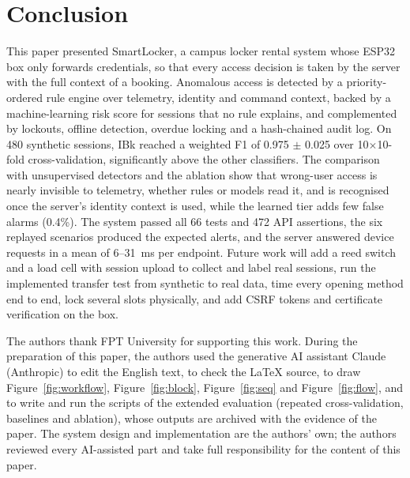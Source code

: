 \section{Conclusion}\label{sec:concl}

This paper presented SmartLocker, a campus locker rental system whose ESP32 box only forwards credentials, so that
every access decision is taken by the server with the full context of a booking. Anomalous access is detected by a
priority-ordered rule engine over telemetry, identity and command context, backed by a machine-learning risk score for
sessions that no rule explains, and complemented by lockouts, offline detection, overdue locking and a hash-chained audit
log. On 480 synthetic sessions, IBk reached a weighted F1 of 0.975 $\pm$ 0.025 over 10$\times$10-fold cross-validation,
significantly above the other classifiers. The comparison with unsupervised detectors and the ablation show that
wrong-user access is nearly invisible to telemetry, whether rules or models read it, and is recognised once the server's
identity context is used, while the learned tier adds few false alarms (0.4\%). The system passed all 66 tests and 472
API assertions, the six replayed scenarios produced the expected alerts, and the server answered device requests in a
mean of 6--31~ms per endpoint. Future work will add a reed switch and a load cell with session upload to collect and
label real sessions, run the implemented transfer test from synthetic to real data, time every opening method end to
end, lock several slots physically, and add CSRF tokens and certificate verification on the box.

\begin{acks}
The authors thank FPT University for supporting this work. During the preparation of this paper, the authors used the
generative AI assistant Claude (Anthropic) to edit the English text, to check the \LaTeX{} source, to draw
Figure~\ref{fig:workflow}, Figure~\ref{fig:block}, Figure~\ref{fig:seq} and Figure~\ref{fig:flow}, and to write and run
the scripts of the extended evaluation (repeated cross-validation, baselines and ablation), whose outputs are archived
with the evidence of the paper. The system design and implementation are the authors' own; the authors reviewed every
AI-assisted part and take full responsibility for the content of this paper.
\end{acks}





